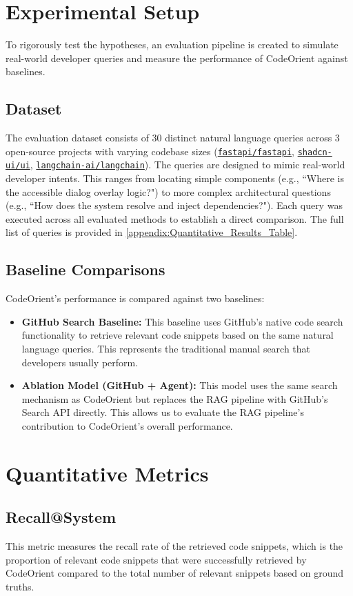 \section{Experimental Setup}
To rigorously test the hypotheses, an evaluation pipeline is created to simulate real-world developer queries and measure the performance of CodeOrient against baselines.
\subsection{Dataset}
The evaluation dataset consists of 30 distinct natural language queries across 3 open-source projects with varying codebase sizes (\href{https://github.com/fastapi/fastapi}{\texttt{fastapi/fastapi}}, \href{https://github.com/shadcn-ui/ui}{\texttt{shadcn-ui/ui}}, \href{https://github.com/langchain-ai/langchain}{\texttt{langchain-ai/langchain}}). The queries are designed to mimic real-world developer intents. This ranges from locating simple components (e.g., ``Where is the accessible dialog overlay logic?") to more complex architectural questions (e.g., ``How does the system resolve and inject dependencies?"). Each query was executed across all evaluated methods to establish a direct comparison. The full list of queries is provided in \autoref{appendix:Quantitative_Results_Table}.
\subsection{Baseline Comparisons}
CodeOrient's performance is compared against two baselines:
\begin{itemize}
    \item \textbf{GitHub Search Baseline:} This baseline uses GitHub's native code search functionality to retrieve relevant code snippets based on the same natural language queries. This represents the traditional manual search that developers usually perform.
    \item \textbf{Ablation Model (GitHub + Agent):} This model uses the same search mechanism as CodeOrient but replaces the RAG pipeline with GitHub's Search API directly. This allows us to evaluate the RAG pipeline's contribution to CodeOrient's overall performance.
\end{itemize}

\section{Quantitative Metrics}
\subsection{Recall@System}
This metric measures the recall rate of the retrieved code snippets, which is the proportion of relevant code snippets that were successfully retrieved by CodeOrient compared to the total number of relevant snippets based on ground truths. 
